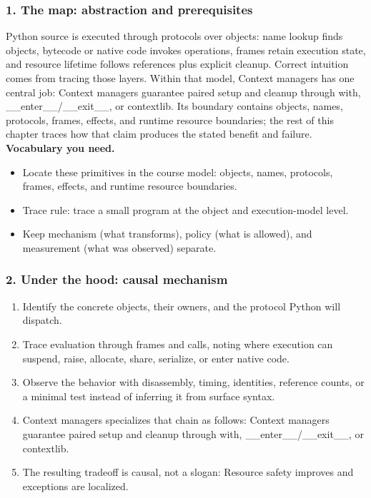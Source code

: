 \subsubsection*{1. The map: abstraction and prerequisites}
Python source is executed through protocols over objects: name lookup finds objects, bytecode or native code invokes operations, frames retain execution state, and resource lifetime follows references plus explicit cleanup. Correct intuition comes from tracing those layers.
Within that model, Context managers has one central job: Context managers guarantee paired setup and cleanup through with, \_\_enter\_\_/\_\_exit\_\_, or contextlib. Its boundary contains objects, names, protocols, frames, effects, and runtime resource boundaries; the rest of this chapter traces how that claim produces the stated benefit and failure.
\textbf{Vocabulary you need.}\begin{itemize}
\item Locate these primitives in the course model: objects, names, protocols, frames, effects, and runtime resource boundaries.
\item Trace rule: trace a small program at the object and execution-model level.
\item Keep mechanism (what transforms), policy (what is allowed), and measurement (what was observed) separate.
\end{itemize}
\subsubsection*{2. Under the hood: causal mechanism}\begin{enumerate}
\item Identify the concrete objects, their owners, and the protocol Python will dispatch.
\item Trace evaluation through frames and calls, noting where execution can suspend, raise, allocate, share, serialize, or enter native code.
\item Observe the behavior with disassembly, timing, identities, reference counts, or a minimal test instead of inferring it from surface syntax.
\item Context managers specializes that chain as follows: Context managers guarantee paired setup and cleanup through with, \_\_enter\_\_/\_\_exit\_\_, or contextlib.
\item The resulting tradeoff is causal, not a slogan: Resource safety improves and exceptions are localized.
\end{enumerate}
